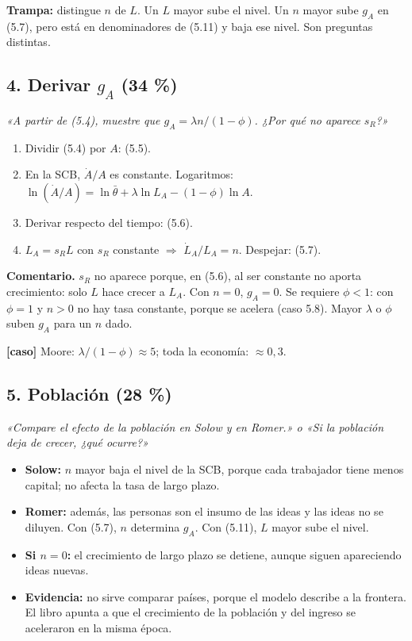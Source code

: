 \documentclass[11pt,a4paper]{article}
\begin{document}
\textbf{Trampa:} distingue \textbf{$n$} de \textbf{$L$}. Un $L$ mayor sube el nivel. Un $n$ mayor sube $g_A$ en (5.7), pero está en denominadores de (5.11) y baja ese nivel. Son preguntas distintas.

\subsection*{4. Derivar $g_A$ (34 \%)}

\emph{«A partir de (5.4), muestre que $g_A = \lambda n/(1-\phi)$. ¿Por qué no aparece $s_R$?»}

\begin{enumerate}[leftmargin=*,itemsep=2pt,topsep=2pt]
\item Dividir (5.4) por $A$: (5.5).
\item En la SCB, $\dot A/A$ es constante. Logaritmos: $\ln(\dot A/A) = \ln\bar\theta + \lambda\ln L_A - (1-\phi)\ln A$.
\item Derivar respecto del tiempo: (5.6).
\item $L_A = s_R L$ con $s_R$ constante $\Rightarrow$ $\dot L_A/L_A = n$. Despejar: (5.7).
\end{enumerate}

\textbf{Comentario.} $s_R$ no aparece porque, en (5.6), al ser constante no aporta crecimiento: solo $L$ hace crecer a $L_A$. Con $n = 0$, $g_A = 0$. Se requiere $\phi < 1$: con $\phi = 1$ y $n > 0$ no hay tasa constante, porque se acelera (caso 5.8). Mayor $\lambda$ o $\phi$ suben $g_A$ para un $n$ dado.

\textbf{[caso]} Moore: $\lambda/(1-\phi) \approx 5$; toda la economía: $\approx 0{,}3$.

\subsection*{5. Población (28 \%)}

\emph{«Compare el efecto de la población en Solow y en Romer.» o «Si la población deja de crecer, ¿qué ocurre?»}

\begin{itemize}[leftmargin=*,itemsep=2pt,topsep=2pt]
\item \textbf{Solow:} $n$ mayor baja el nivel de la SCB, porque cada trabajador tiene menos capital; no afecta la tasa de largo plazo.
\item \textbf{Romer:} además, las personas son el insumo de las ideas y las ideas no se diluyen. Con (5.7), $n$ determina $g_A$. Con (5.11), $L$ mayor sube el nivel.
\item \textbf{Si $n = 0$:} el crecimiento de largo plazo se detiene, aunque siguen apareciendo ideas nuevas.
\item \textbf{Evidencia:} no sirve comparar países, porque el modelo describe a la frontera. El libro apunta a que el crecimiento de la población y del ingreso se aceleraron en la misma época.
\end{itemize}
\end{document}
